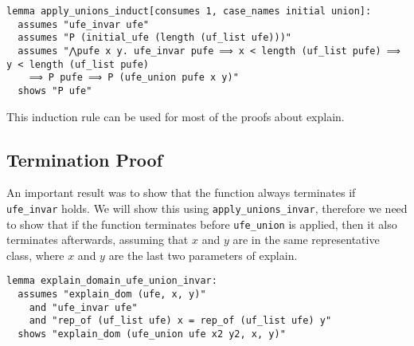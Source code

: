 \begin{lstlisting}
lemma apply_unions_induct[consumes 1, case_names initial union]:
  assumes "ufe_invar ufe"
  assumes "P (initial_ufe (length (uf_list ufe)))"
  assumes "⋀pufe x y. ufe_invar pufe ⟹ x < length (uf_list pufe) ⟹ y < length (uf_list pufe)
    ⟹ P pufe ⟹ P (ufe_union pufe x y)"
  shows "P ufe"
\end{lstlisting}

This induction rule can be used for most of the proofs about explain.

\subsection{Termination Proof}
\label{subsection:termination}

An important result was to show that the function always terminates if \lstinline{ufe_invar} holds. We will show this using \lstinline|apply_unions_invar|, therefore we need to show that if the function terminates before \lstinline{ufe_union} is applied, then it also terminates afterwards, assuming that $x$ and $y$ are in the same representative class, where $x$ and $y$ are the last two parameters of explain.

\begin{lstlisting}
lemma explain_domain_ufe_union_invar:
  assumes "explain_dom (ufe, x, y)"
    and "ufe_invar ufe"
    and "rep_of (uf_list ufe) x = rep_of (uf_list ufe) y"
  shows "explain_dom (ufe_union ufe x2 y2, x, y)"
\end{lstlisting}

